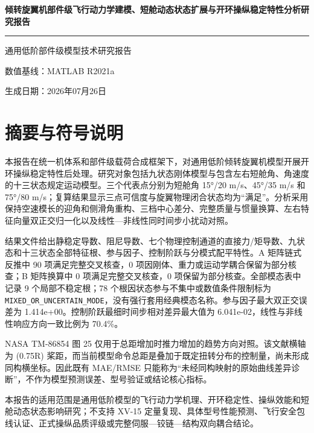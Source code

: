 \documentclass[UTF8,11pt,oneside,openany,fontset=windows]{ctexbook}
\begin{document}
\begin{titlepage}
\centering
\vspace*{28mm}
{\bfseries\color[HTML]{2E74B5} 倾转旋翼机部件级飞行动力学建模、短舱动态状态扩展与开环操纵稳定特性分析研究报告\par}
\vspace{14mm}
\rule{0.78\textwidth}{0.8pt}\par
\vspace{12mm}
{ 通用低阶部件级模型技术研究报告\par}
\vfill
{ 数值基线：MATLAB R2021a\par}
\vspace{4mm}
{ 生成日期：2026年07月26日\par}
\end{titlepage}
\frontmatter
\tableofcontents
\listoffigures
\listoftables
\mainmatter
\chapter{摘要与符号说明}\label{ux6458ux8981ux4e0eux7b26ux53f7ux8bf4ux660e}

本报告在统一机体系和部件级载荷合成框架下，对通用低阶倾转旋翼机模型开展开环操纵稳定特性后处理。研究对象包括九状态刚体模型与包含左右短舱角、角速度的十三状态规定运动模型。三个代表点分别为短舱角
15°/20 m/s、45°/35 m/s 和 75°/80
m/s；复算结果显示三点可信度与旋翼物理闭合状态均为``满足''。分析采用保持空速模长的迎角和侧滑角重构、三档中心差分、完整质量与惯量换算、左右特征向量双正交归一化以及线性---非线性同时间步小扰动对照。

结果文件给出静稳定导数、阻尼导数、七个物理控制通道的直接力/矩导数、九状态和十三状态全部特征根、参与因子、控制阶跃与分模式配平特性。A
矩阵链式反推中 90 项满足完整交叉核查，0
项因刚体、重力或运动学耦合保留为部分核查；B 矩阵换算中 0
项满足完整交叉核查，0 项保留为部分核查。全部模态表中记录 9
个局部不稳定根；78 个根因状态参与不集中或数值条件限制标为
\texttt{MIXED\_OR\_UNCERTAIN\_MODE}，没有强行套用经典模态名称。参与因子最大双正交误差为
1.414e+00。控制阶跃最细时间步相对差异最大值为
6.041e-02，线性与非线性响应方向一致比例为 70.4\%。

NASA TM-86854 图 25 仅用于总距增加时推力增加的趋势方向对照。该文献横轴为
(0.75R)
桨距，而当前模型命令总距是叠加于既定扭转分布的控制量，尚未形成同构横坐标。因此既有
MAE/RMSE
只能称为``未经同构映射的原始曲线差异诊断''，不作为模型预测误差、型号验证或结论核心指标。

本报告的适用范围是通用低阶模型的飞行动力学机理、开环稳定性、操纵效能和短舱动态状态影响研究；不支持
XV-15
定量复现、具体型号性能预测、飞行安全包线认证、正式操纵品质评级或完整伺服---铰链---结构双向耦合结论。
\end{document}
